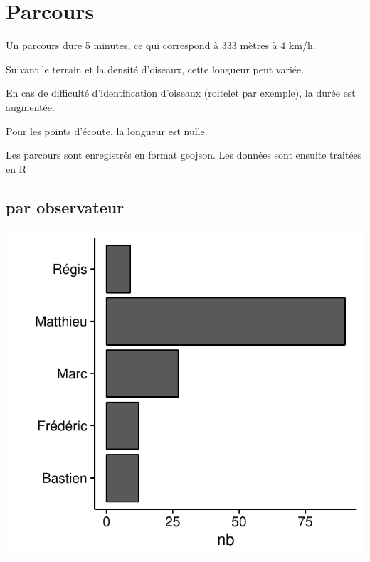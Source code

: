 \renewcommand{\monlhead}{Parcours}
\section{Parcours}
Un parcours dure 5 minutes, ce qui correspond à 333 mètres à 4 km/h.

Suivant le terrain et la densité d'oiseaux, cette longueur peut variée.

En cas de difficulté d'identification d'oiseaux (roitelet par exemple), la durée est augmentée.

Pour les points d'écoute, la longueur est nulle.

Les parcours sont enregistrés en format geojson. Les données sont ensuite traitées en R

\subsection{par observateur}
\includegraphics[width=\malargeurgraphique]{images/parcours_stat_champ_prenom.pdf}
